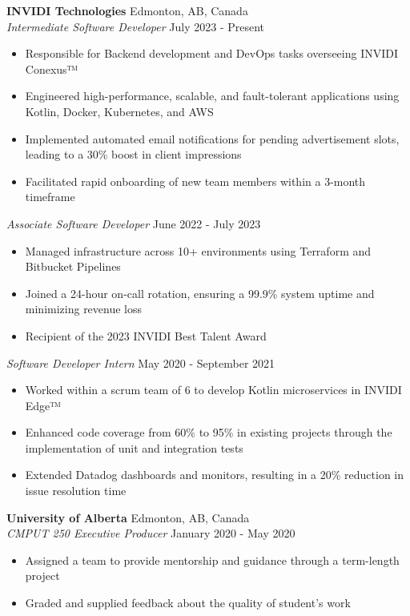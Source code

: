 \documentclass[a4paper]{article}
\begin{document}
\textbf{INVIDI Technologies} \hfill Edmonton, AB, Canada\\
\textit{Intermediate Software Developer} \hfill July 2023 - Present\\
\vspace{-1mm}
\begin{itemize} \itemsep 1pt
	\item Responsible for Backend development and DevOps tasks overseeing INVIDI Conexus™
	\item Engineered high-performance, scalable, and fault-tolerant applications using Kotlin, Docker, Kubernetes, and AWS
	\item Implemented automated email notifications for pending advertisement slots, leading to a 30\% boost in client impressions
    \item Facilitated rapid onboarding of new team members within a 3-month timeframe
\end{itemize}
\textit{Associate Software Developer} \hfill June 2022 - July 2023\\
\vspace{-1mm}
\begin{itemize} \itemsep 1pt
    \item Managed infrastructure across 10+ environments using Terraform and Bitbucket Pipelines
	\item Joined a 24-hour on-call rotation, ensuring a 99.9\% system uptime and minimizing revenue loss
    \item Recipient of the 2023 INVIDI Best Talent Award
\end{itemize}
\textit{Software Developer Intern} \hfill May 2020 - September 2021\\
\vspace{-1mm}
\begin{itemize} \itemsep 1pt
	\item Worked within a scrum team of 6 to develop Kotlin microservices in INVIDI Edge™
	\item Enhanced code coverage from 60\% to 95\% in existing projects through the implementation of unit and integration tests
	\item Extended Datadog dashboards and monitors, resulting in a 20\% reduction in issue resolution time
\end{itemize}
\textbf{University of Alberta} \hfill Edmonton, AB, Canada\\
\textit{CMPUT 250 Executive Producer} \hfill January 2020 - May 2020\\
\vspace{-1mm}
\begin{itemize} \itemsep 1pt
    \item Assigned a team to provide mentorship and guidance through a term-length project
	\item Graded and supplied feedback about the quality of student's work
\end{itemize}
\end{document}
